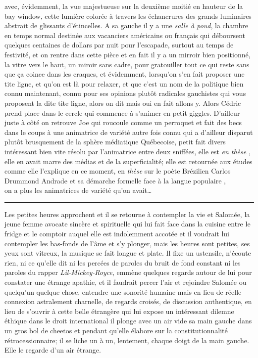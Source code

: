 avec, évidemment, la vue majestueuse sur la deuxième moitié en hauteur de la bay
window, cette lumière colorée à travers les échancrures des grands luminaires
abstrait de glissants d'étincelles.  
A sa gauche il y a une \emph{salle à poud}, la chambre en temps normal 
destinée aux vacanciers
américains ou français qui déboursent quelques centaines de dollars par nuit
pour l'escapade, surtout au temps de festivité, et on rentre dans cette pièce
et en fait il y a un mirroir bien positionné, la vitre vers le haut, un miroir
sans cadre, pour gratouiller tout ce qui reste sans que ça coince dans les
craques, et évidemment, lorsqu'on s'en fait proposer une tite ligne, et qu'on
est là pour relaxer, et que c'est un nom de la politique bien connu maintenant,
connu pour ses opinions plutôt radicales gauchistes qui vous proposent la dite
tite ligne, alors on dit mais oui en fait allons y. Alors Cédric prend place
dans le cercle qui commence à s'animer en petit giggles. D'ailleur juste à côté
on retrouve Joe qui roucoule comme un perroquet et fait des becs dans le coups
à une animatrice
de variété autre fois connu qui a d'ailleur disparut plutôt brusquement de la
sphère médiatique Québecoise, petit fait divers intéressant bien vite résolu par
l'animatrice entre deux sniffées, elle est \emph{en thèse} , elle en avait marre
des médias et de la superficialité; elle est retournée aux études comme elle
l'explique en ce moment, en \emph{thèse} sur le poète Brézilien Carlos Drummond
Andrade et sa démarche formelle face à la langue populaire , \\ on a plus les
animatrices de variété qu'on avait\ldots\newpage

\begin{center}\noindent\rule{0.5\textwidth}{0.4pt}\end{center} Les petites
heures approchent et il se retourne à contempler la vie et Salomée, la jeune
femme avocate sincère et spirituelle qui lui fait face dans la cuisine entre le
fridge et le comptoir auquel elle est indolemment accotée et il voudrait lui
contempler les bas-fonds de l'âme et s'y plonger, mais les heures sont petites,
ses yeux sont vitreux, la musique se fait longue et plate.  Il fixe un
ustensile, n'écoute rien, ni ce qu'elle dit ni les percées de paroles du bruit
de fond constant ni les paroles du rapper \textit{Lil-Mickey-Royce}, emmène
quelques regards autour de lui pour constater une étrange apathie, et il
faudrait percer l'air et rejoindre Salomée ou quelqu'un quelque chose, entendre
une sonorité humaine mais en lieu de réelle connexion astralement charnelle, de
regards croisés, de discussion authentique, en lieu de s'ouvrir à cette belle
étrangère qui lui expose un intéressant dilemne éthique dans le droit
international il plonge avec un air vide sa main gauche dans un gros bol de
cheetos et pendant qu'elle élabore sur la constitutionnalité rétrocessionnaire;
il se liche un à un, lentement, chaque doigt de la main gauche. Elle le regarde
d'un air étrange. \\


